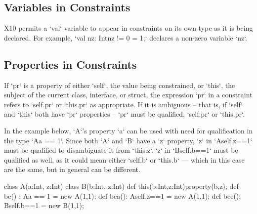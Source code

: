 \subsection{Variables in Constraints}


X10 permits a \xcd`val` variable to appear in constraints on its own type as
it is being declared.  For example, \xcd`val nz: Int{nz != 0} = 1;` declares a
non-zero variable \xcd`nz`.


\subsection{Properties in Constraints}

If \xcd`pr` is a property of either \xcd`self`, the value being constrained,
or  \xcd`this`, the subject of the current class, interface, or struct, the
expression \xcd`pr` in a constraint refers to \xcd`self.pr` or \xcd`this.pr`
as appropriate.  If it is ambiguous -- that is, if \xcd`self` and \xcd`this`
both have \xcd`pr` properties -- \xcd`pr` must be qualified, \xcd`self.pr` or
\xcd`this.pr`.

In the example below, \xcd`A`'s property \xcd`a` can be used with need for
qualification in the type \xcd`A{a == 1}`.  Since both \xcd`A` and \xcd`B`
have a \xcd`z` property, \xcd`z` in \xcd`A{self.z==1}` must be qualified to
disambiguate it from \xcd`this.z`.  
\xcd`z` in \xcd`B{self.b==1}` must be qualified as well, as it could mean
either \xcd`self.b` or \xcd`this.b` --- which in this case are the same, but
in general can be different.
\begin{xten}
class A(a:Int, z:Int){}
class B(b:Int, z:Int){
  def this(b:Int,z:Int){property(b,z);}
  def be() : A{a == 1}    = new A(1,1);
  def bea(): A{self.z==1} = new A(1,1);
  def bee(): B{self.b==1} = new B(1,1);
}
\end{xten}
%




